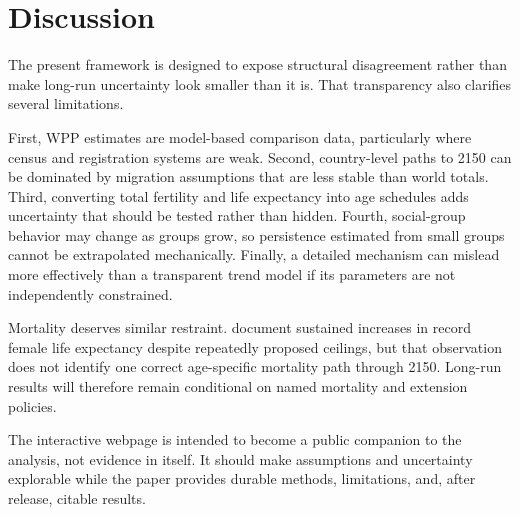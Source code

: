 \section{Discussion}

The present framework is designed to expose structural disagreement rather
than make long-run uncertainty look smaller than it is. That transparency also
clarifies several limitations.

First, WPP estimates are model-based comparison data, particularly where census
and registration systems are weak. Second, country-level paths to 2150 can be
dominated by migration assumptions that are less stable than world totals.
Third, converting total fertility and life expectancy into age schedules adds
uncertainty that should be tested rather than hidden. Fourth, social-group
behavior may change as groups grow, so persistence estimated from small groups
cannot be extrapolated mechanically. Finally, a detailed mechanism can mislead
more effectively than a transparent trend model if its parameters are not
independently constrained.

Mortality deserves similar restraint. \citet{oeppen2002} document sustained
increases in record female life expectancy despite repeatedly proposed
ceilings, but that observation does not identify one correct age-specific
mortality path through 2150. Long-run results will therefore remain conditional
on named mortality and extension policies.

The interactive webpage is intended to become a public companion to the
analysis, not evidence in itself. It should make assumptions and uncertainty
explorable while the paper provides durable methods, limitations, and, after
release, citable results.

